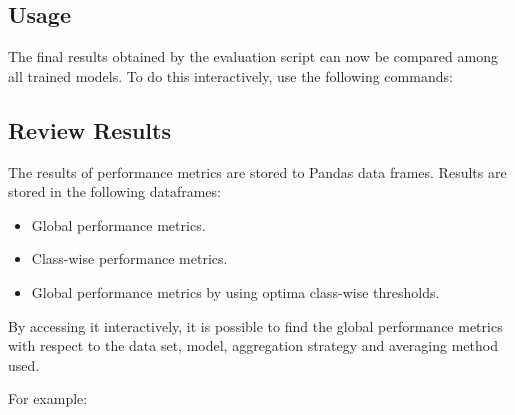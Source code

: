 \documentclass[letterpaper,10pt,english]{sphinxmanual}
\begin{document}
\subsection{Usage}
\label{\detokenize{results:usage}}
The final results obtained by the evaluation script can now be compared among all
trained models. To do this interactively, use the following commands:

%
\begin{sphinxVerbatim}[commandchars=\\\{\}]
 
 
\end{sphinxVerbatim}


\subsection{Review Results}
\label{\detokenize{results:review-results}}
The results of performance metrics are stored to Pandas data frames. Results are stored
in the following  dataframes:
\begin{itemize}
\item {} 
 Global performance metrics.

\item {} 
 Class-wise performance metrics.

\item {} 
 Global performance metrics by using optima class-wise thresholds.

\end{itemize}

By accessing it interactively, it is possible to find the global performance
metrics with respect to the data set, model, aggregation strategy and averaging
method used.

For example:
\end{document}
